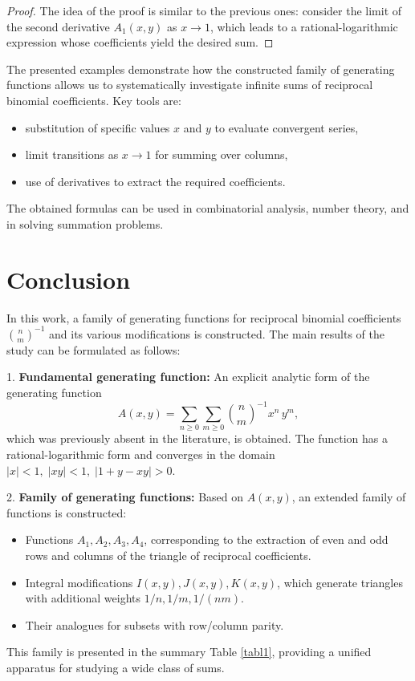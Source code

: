 \documentclass[12pt]{article}
\begin{document}
\begin{proof}
The idea of the proof is similar to the previous ones: consider the limit of the second derivative \( A_1(x,y) \) as \( x \to 1 \), which leads to a rational-logarithmic expression whose coefficients yield the desired sum.
\end{proof}

The presented examples demonstrate how the constructed family of generating functions allows us to systematically investigate infinite sums of reciprocal binomial coefficients. Key tools are:
\begin{itemize}
\item substitution of specific values \( x \) and \( y \) to evaluate convergent series,
\item limit transitions as \( x \to 1 \) for summing over columns,
\item use of derivatives to extract the required coefficients.
\end{itemize}
The obtained formulas can be used in combinatorial analysis, number theory, and in solving summation problems.

\section{Conclusion}

In this work, a family of generating functions for reciprocal binomial coefficients \( \binom{n}{m}^{-1} \) and its various modifications is constructed. The main results of the study can be formulated as follows:

1. \textbf{Fundamental generating function:}
An explicit analytic form of the generating function
\[
A(x,y) = \sum_{n\geqslant 0}\sum_{m\geqslant 0} {\binom{n}{m}}^{-1}x^n\,y^m,
\]
which was previously absent in the literature, is obtained. The function has a rational-logarithmic form and converges in the domain \( |x| < 1, \; |xy| < 1, \; |1+y-xy| > 0 \).

2. \textbf{Family of generating functions:}
Based on \( A(x,y) \), an extended family of functions is constructed:
\begin{itemize}
    \item Functions \( A_1, A_2, A_3, A_4 \), corresponding to the extraction of even and odd rows and columns of the triangle of reciprocal coefficients.
    \item Integral modifications \( I(x,y), J(x,y), K(x,y) \), which generate triangles with additional weights \( 1/n, 1/m, 1/(nm) \).
    \item Their analogues for subsets with row/column parity.
\end{itemize}
This family is presented in the summary Table \ref{tabl1}, providing a unified apparatus for studying a wide class of sums.
\end{document}

